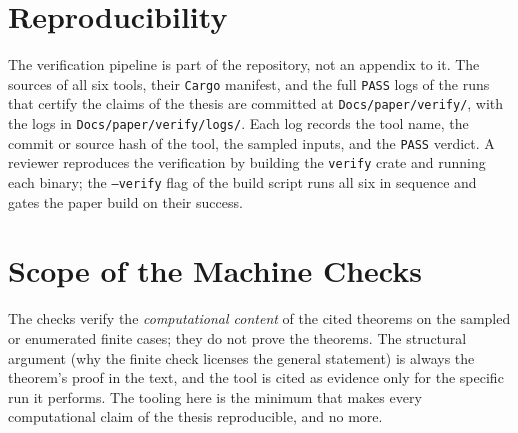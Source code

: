 \section{Reproducibility}
The verification pipeline is part of the repository, not an appendix to it. The sources of all six tools, their \texttt{Cargo} manifest, and the full \texttt{PASS} logs of the runs that certify the claims of the thesis are committed at \texttt{Docs/paper/verify/}, with the logs in \texttt{Docs/paper/verify/logs/}. Each log records the tool name, the commit or source hash of the tool, the sampled inputs, and the \texttt{PASS} verdict. A reviewer reproduces the verification by building the \texttt{verify} crate and running each binary; the \texttt{--verify} flag of the build script runs all six in sequence and gates the paper build on their success.

\section{Scope of the Machine Checks}
The checks verify the \emph{computational content} of the cited theorems on the sampled or enumerated finite cases; they do not prove the theorems. The structural argument (why the finite check licenses the general statement) is always the theorem's proof in the text, and the tool is cited as evidence only for the specific run it performs. The tooling here is the minimum that makes every computational claim of the thesis reproducible, and no more.
